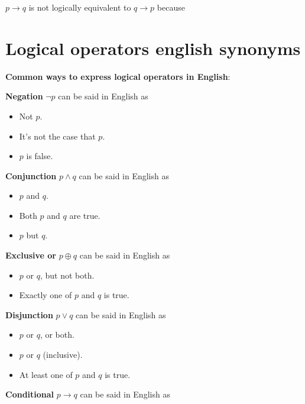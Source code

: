 \documentclass[12pt, oneside]{article}
\begin{document}
$p \to q$ is not logically equivalent to $q \to p$ because \underline{\phantom{\hspace{4in}}} 
 \vfill
\section*{Logical operators english synonyms}


{\bf Common ways to express logical operators in English}:

{\bf Negation} $\lnot p$ can be said in English as 

\vspace{-20pt}
\begin{itemize}
\item Not $p$.
\item It's not the case that $p$.
\item $p$ is false.
\end{itemize}

{\bf Conjunction} $p \land q$ can be said in English as

\vspace{-20pt}
\begin{itemize}
    \item $p$ and $q$.
    \item Both $p$ and $q$ are true.
    \item $p$ but $q$.
\end{itemize}

{\bf Exclusive or} $p \oplus q$ can be said in English as

\vspace{-20pt}
\begin{itemize}
    \item $p$ or $q$, but not both.
    \item Exactly one of $p$ and $q$ is true.
\end{itemize}

{\bf Disjunction} $p \lor q$ can be said in English as

\vspace{-20pt}
\begin{itemize}
    \item $p$ or $q$, or both.
    \item $p$ or $q$ (inclusive).
    \item At least one of $p$ and $q$ is true.
\end{itemize}

{\bf Conditional} $p \to q$ can be said in English as
\end{document}

